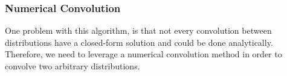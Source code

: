 \documentclass[10pt,sigconf,letterpaper,anonymous,nonacm]{acmart}
\begin{document}




\subsubsection{Numerical Convolution}
One problem with this algorithm, is that not every convolution between distributions have a 
closed-form solution and could be done analytically.
Therefore, we need to leverage a numerical convolution method in order to convolve two arbitrary
distributions.
\end{document}
